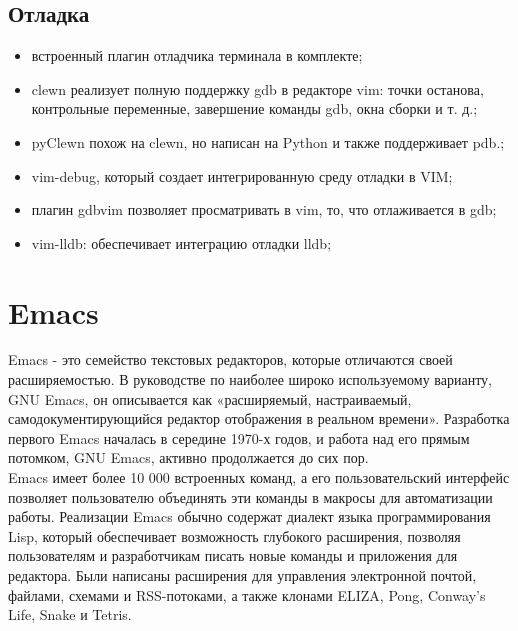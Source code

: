 \subsection{Отладка}
\begin{itemize}
    \item встроенный плагин отладчика терминала в комплекте;\\
    \item clewn реализует полную поддержку gdb в редакторе vim: точки останова, контрольные переменные, завершение команды gdb, окна сборки и т. д.;\\
    \item pyClewn похож на clewn, но написан на Python и также поддерживает pdb.;\\
    \item vim-debug, который создает интегрированную среду отладки в VIM;\\
    \item плагин gdbvim позволяет просматривать в vim, то, что отлаживается в gdb;\\
    \item vim-lldb: обеспечивает интеграцию отладки lldb;\\
\end{itemize}

\section{Emacs}
Emacs - это семейство текстовых редакторов, которые отличаются своей расширяемостью. В руководстве 
по наиболее широко используемому варианту, GNU Emacs, он описывается как «расширяемый, 
настраиваемый, самодокументирующийся редактор отображения в реальном времени». Разработка первого 
Emacs началась в середине 1970-х годов, и работа над его прямым потомком, GNU Emacs, активно 
продолжается до сих пор.\\

Emacs имеет более 10 000 встроенных команд, а его пользовательский интерфейс позволяет пользователю
объединять эти команды в макросы для автоматизации работы. Реализации Emacs обычно содержат диалект 
языка программирования Lisp, который обеспечивает возможность глубокого расширения, позволяя 
пользователям и разработчикам писать новые команды и приложения для редактора. Были написаны 
расширения для управления электронной почтой, файлами, схемами и RSS-потоками, а также клонами 
ELIZA, Pong, Conway's Life, Snake и Tetris.\\

